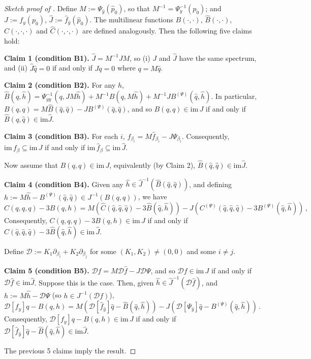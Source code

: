 \documentclass[11pt]{amsart}
\newcommand{\wB}{\widehat{B}}
\newcommand{\wC}{\widehat{C}}
\newcommand{\wJ}{\hat{J}}
\newcommand{\mD}{\mathcal{D}}
\theoremstyle{definition}
\begin{document}
\begin{proof}[Sketch proof of ]
Define $M := \Psi_{\hat{y}}(\hat{p}_0)$, so that $M^{-1} = \Psi^{-1}_y(p_0)$; and $J := f_y(p_0)$, $\wJ := \hat{f}_{\hat{y}}(\hat{p}_0)$. The multilinear functions $B(\cdot, \cdot)$, $\wB(\cdot, \cdot)$, $C(\cdot, \cdot, \cdot)$ and $\wC(\cdot, \cdot, \cdot)$ are defined analogously. Then the following five claims hold:

{\bf Claim 1 (condition B1).} $\wJ = M^{-1} J M$, so (i) $J$ and $\wJ$ have the same spectrum, and (ii) $\wJ \hat{q} = 0$ if and only if $Jq = 0$ where $q=M\hat{q}$.

{\bf Claim 2 (condition B2).} For any $\hat{h}$, $\wB(\hat{q},\hat{h}) =  \Psi^{-1}_{yy}(q, J M\hat{h}) + M^{-1} B(q,M\hat{h}) + M^{-1}J B^{(\Psi)}(\hat{q},\hat{h})$. In particular, $B(q,q) = M\wB(\hat{q}, \hat{q}) -JB^{(\Psi)}(\hat{q},\hat{q})$, and so $B(q,q) \in \mathrm{im}\,J$ if and only if $\wB(\hat{q},\hat{q}) \in \mathrm{im}\wJ$. 

{\bf Claim 3 (condition B3).} For each $i$, $f_{\beta_i} =M\hat{f}_{\beta_i} -J\Psi_{\beta_i}$. Consequently, $\mathrm{im}\,f_\beta \subseteq \mathrm{im}\,J$ if and only if $\mathrm{im}\,\hat{f}_\beta \subseteq \mathrm{im}\,\wJ$. 

Now assume that $B(q,q) \in \mathrm{im}\,J$, equivalently (by Claim 2), $\wB(\hat{q},\hat{q}) \in \mathrm{im}\wJ$. 

{\bf Claim 4 (condition B4).} Given any $\hat{h} \in \wJ^{-1}(\wB(\hat{q},\hat{q}))$, and defining $h:= M\hat{h} - B^{(\Psi)}(\hat{q},\hat{q}) \in J^{-1}(B(q,q))$, we have
\[
C(q,q,q) - 3B(q,h) = M\left(\wC(\hat{q},\hat{q},\hat{q}) - 3 \wB(\hat{q},\hat{h})\right) -J\left(C^{(\Psi)}(\hat{q},\hat{q},\hat{q}) -3B^{(\Psi)}(\hat{q},\hat{h})\right)\,,
\]
Consequently, $C(q,q,q) - 3B(q,h) \in \mathrm{im}\,J$ if and only if $\wC(\hat{q},\hat{q},\hat{q}) - 3 \wB(\hat{q},\hat{h}) \in\mathrm{im}\,\wJ$. 

Define $\mD := K_1\partial_{\beta_i} + K_2\partial_{\beta_j}$ for some $(K_1,K_2) \neq (0,0)$ and some $i \neq j$.

{\bf Claim 5 (condition B5).} $\mD f = M\mD \hat{f}-J\mD \Psi$, and so $\mD f \in \mathrm{im}\,J$ if and only if $\mD \hat{f} \in \mathrm{im}\wJ$. Suppose this is the case. Then, given $\hat{h} \in \wJ^{-1}(\mD \hat{f})$, and $h := M\hat{h} - \mD\Psi$ (so $h  \in J^{-1}(\mD f)$), 
\[
\mD[f_y] q - B(q,h)  = M\left(\mD[\hat{f}_{\hat{y}}]\hat{q} - \wB(\hat{q}, \hat{h})\right) - J\left(\mD[\Psi_{\hat{y}}]\hat{q} - B^{(\Psi)}(\hat{q},\hat{h})\right)\,.
\]
Consequently, $\mD[f_y] q - B(q,h) \in \mathrm{im}\,J$ if and only if $\mD[\hat{f}_{\hat{y}}]\hat{q} - \wB(\hat{q}, \hat{h}) \in\mathrm{im}\wJ$. 

The previous 5 claims imply the result.
\end{proof}
\end{document}
